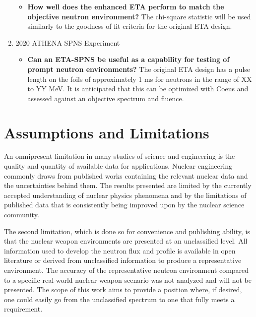 \begin{enumerate}
\begin{itemize}
    	\item \textbf{How well does the enhanced ETA perform to match the objective neutron environment?} The chi-square statistic will be used similarly to the goodness of fit criteria for the original ETA design. %
    \end{itemize}
	\item 2020 ATHENA SPNS Experiment
	\begin{itemize}
		\item \textbf{Can an ETA-SPNS be useful as a capability for testing of prompt neutron environments?} The original ETA design has a pulse length on the foils of approximately 1 ms for neutrons in the range of XX to YY MeV. It is anticipated that this can be optimized with Coeus and assessed against an objective spectrum and fluence. %
			
	\end{itemize}
\end{enumerate}

\section{Assumptions and Limitations}

An omnipresent limitation in many studies of science and engineering is the quality and quantity of available data for applications. 
Nuclear engineering commonly draws from published works containing the relevant nuclear data and the uncertainties behind them. 
The results presented are limited by the currently accepted understanding of nuclear physics phenomena and by the limitations of published data that is consistently being improved upon by the nuclear science community. 

The second limitation, which is done so for convenience and publishing ability, is that the nuclear weapon environments are presented at an unclassified level. 
All information used to develop the neutron flux and profile is available in open literature or derived from unclassified information to produce a representative environment. 
The accuracy of the representative neutron environment compared to a specific real-world nuclear weapon scenario was not analyzed and will not be presented. 
The scope of this work aims to provide a position where, if desired, one could easily go from the unclassified spectrum to one that fully meets a requirement. 

